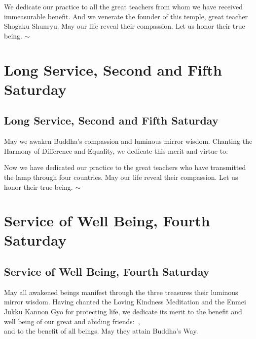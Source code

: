 \documentclass{kdo}
\begin{document}
\begin{services}
\begin{service}
\begin{outdent}
  \femaleAncestors*
\end{outdent}

\kokyo We dedicate our practice to all the great teachers from whom we have
received immeasurable benefit. And we venerate the founder of this temple,
great teacher Shogaku Shunryu. May our life reveal their compassion. Let us
honor their true being. $\sim$ \largebell
\end{service}

\part{Long Service, Second and Fifth Saturday}
\chapter{Long Service, Second and Fifth Saturday}

\begin{service}
\kokyo \makaHannyaHaramittaShingyo
\pagebreak
\kokyo \shosaimyoKichijoDharani
\kokyo {}
\sangha \allBuddhas*
\kokyo \harmonyOfDifferenceAndEquality
\kokyo May we awaken Buddha's compassion and luminous mirror wisdom. Chanting
the Harmony of Difference and Equality, we dedicate this merit and virtue to: \bigspace\clank

\begin{outdent}
  \ancestorsLong*
\end{outdent}

\kokyo Now we have dedicated our practice to the great teachers who have
transmitted the lamp through four countries. May our life reveal their
compassion. Let us honor their true being. $\sim$ \largebell
\end{service}

\part{Service of Well Being, Fourth Saturday}
\chapter{Service of Well Being, Fourth Saturday}
\begin{service}
\kokyo \makaHannyaHaramittaShingyo
\pagebreak
\kokyo \shosaimyoKichijoDharani
\kokyo {}
\kokyo \lovingKindnessMeditation
\kokyo \enmeiJukkuKannonGyo
\kokyo May all awakened beings manifest through the three treasures their
luminous mirror wisdom. Having chanted the Loving Kindness Meditation and the
Enmei Jukku Kannon Gyo for protecting life, we dedicate its merit to the
benefit and well being of our great and abiding friends: \hrulefill\,,\\
and to the benefit of all beings. May they attain Buddha's Way. \largebell
\end{service}
\end{services}
\end{document}

